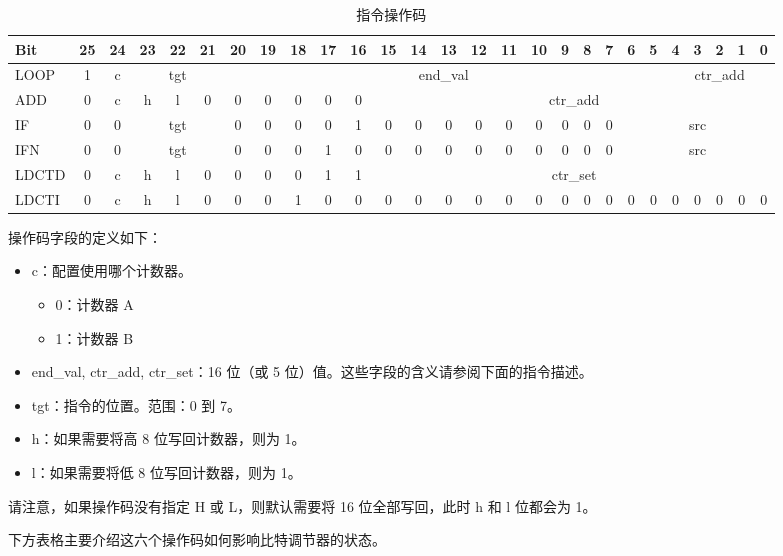 \documentclass[main\_\_CN.tex]{subfiles}
\begin{document}
\bgroup
\setlength{\tabcolsep}{0.4em}
\begin{table}[H]
\centering
\caption{指令操作码}
\label{tab:bitscrm-instruction-opcode}
\begin{tabular}{|l|c|c|c|c|c|c|c|c|c|c|c|c|c|c|c|c|c|c|c|c|c|c|c|c|c|c|}
\hline\rowcolor{lightgray}
Bit & 25 & 24 & 23 & 22 & 21 & 20 & 19 & 18 & 17 & 16 & 15 & 14 & 13 & 12 & 11 & 10 & 9 & 8 & 7 & 6 & 5 & 4 & 3 & 2 & 1 & 0 \\
\hline
LOOP & 1 & c & \multicolumn{3}{|c|}{tgt} & \multicolumn{16}{|c|}{end\_val} & \multicolumn{5}{|c|}{ctr\_add}  \\
\hline
ADD & 0 & c & h & l & 0 & 0 & 0 & 0 & 0 & 0 & \multicolumn{16}{|c|}{ctr\_add} \\
\hline
IF & 0 & 0 & \multicolumn{3}{|c|}{tgt} & 0 & 0 & 0 & 0 & 1 & 0 & 0 & 0 & 0 & 0 & 0 & 0 & 0 & 0 & \multicolumn{7}{|c|}{src} \\
\hline
IFN & 0 & 0 & \multicolumn{3}{|c|}{tgt} & 0 & 0 & 0 & 1 & 0 & 0 & 0 & 0 & 0 & 0 & 0 & 0 & 0 & 0 & \multicolumn{7}{|c|}{src} \\
\hline
LDCTD & 0 & c & h & l & 0 & 0 & 0 & 0 & 1 & 1 & \multicolumn{16}{|c|}{ctr\_set} \\
\hline
LDCTI & 0 & c & h & l & 0 & 0 & 0 & 1 & 0 & 0 & 0 & 0 & 0 & 0 & 0 & 0 & 0 & 0 & 0 & 0 & 0 & 0 & 0 & 0 & 0 & 0 \\
\hline
\end{tabular}
\end{table}
\egroup

操作码字段的定义如下：

\begin{itemize}
\item c：配置使用哪个计数器。
\begin{itemize}
    \item 0：计数器 A
    \item 1：计数器 B
\end{itemize}
\item end\_val, ctr\_add, ctr\_set：16 位（或 5 位）值。这些字段的含义请参阅下面的指令描述。
\item tgt：指令的位置。范围：0 到 7。
\item h：如果需要将高 8 位写回计数器，则为 1。
\item l：如果需要将低 8 位写回计数器，则为 1。
\end{itemize}

请注意，如果操作码没有指定 H 或 L，则默认需要将 16 位全部写回，此时 h 和 l 位都会为 1。

下方表格主要介绍这六个操作码如何影响比特调节器的状态。
\end{document}
